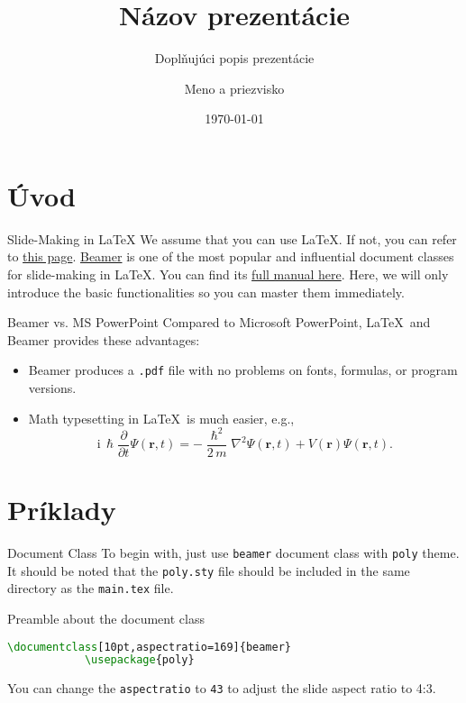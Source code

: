 \documentclass[10pt,aspectratio=169]{beamer}
\title{Názov prezentácie}
\subtitle{Doplňujúci popis prezentácie}
\author{Meno a priezvisko}
\institute{Pozícia}
\date{\today}
\begin{document}
	\maketitle

	\section{Úvod}

	\begin{frame}{Slide-Making in \LaTeX}
		We assume that you can use \LaTeX. If not, you can refer to \href{https://www.overleaf.com/learn/latex/Learn_LaTeX_in_30_minutes}{this page}.
		\href{https://www.overleaf.com/learn/latex/Beamer}{Beamer} is one of the most popular and influential document classes for slide-making in \LaTeX. 
		You can find its \href{https://mirror-hk.koddos.net/CTAN/macros/latex/contrib/beamer/doc/beameruserguide.pdf}{full manual here}.
		Here, we will only introduce the basic functionalities so you can master them immediately.
	\end{frame}

	\begin{frame}{Beamer vs. MS PowerPoint}
		Compared to Microsoft PowerPoint, \LaTeX\ and Beamer provides these advantages:
		\begin{itemize}
			\item Beamer produces a \texttt{.pdf} file with no problems on fonts, formulas, or program versions.
			\item Math typesetting in \LaTeX\ is much easier, e.g.,
				\begin{equation*}
					\mathrm{i}\,\hslash\frac{\partial}{\partial t} \Psi(\mathbf{r},t) =
					-\frac{\hslash^2}{2\,m}\nabla^2\Psi(\mathbf{r},t)
					+ V(\mathbf{r})\Psi(\mathbf{r},t).
				\end{equation*}
		\end{itemize}
	\end{frame}

	\section{Príklady}

	\begin{frame}[fragile]{Document Class}
		To begin with, just use \texttt{beamer} document class with \texttt{poly} theme. It should be noted that the \texttt{poly.sty} file should be included in the same directory as the \texttt{main.tex} file.
		\begin{block}{Preamble about the document class}
			\begin{lstlisting}[language=TeX]
			\documentclass[10pt,aspectratio=169]{beamer}
			\usepackage{poly}
			\end{lstlisting}
		\end{block}
		You can change the \texttt{aspectratio} to \texttt{43} to adjust the slide aspect ratio to 4:3.
	\end{frame}
\end{document}
